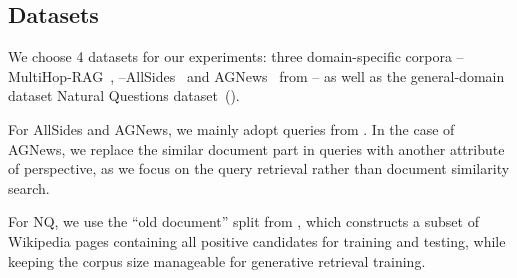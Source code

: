 \subsection{Datasets}
We choose 4 datasets for our experiments: three domain-specific corpora -- MultiHop-RAG~\citep{DBLP:journals/corr/abs-2401-15391}, --AllSides~\citep{baly-etal-2020-detect} and AGNews~\citep{DBLP:conf/nips/YuZZMRKSZ23} from \citet{DBLP:journals/corr/abs-2405-02714} -- as well as the general-domain dataset Natural Questions dataset~(\citealp[NQ]{kwiatkowski-etal-2019-natural}).

For AllSides and AGNews, we mainly adopt queries from \citet{DBLP:journals/corr/abs-2405-02714}.
In the case of AGNews, we replace the similar document part in queries with another attribute of perspective, as we focus on the query retrieval rather than document similarity search.

For NQ, we use the ``old document'' split from \citet{DBLP:conf/icml/KishoreWLAW23}, which constructs a subset of Wikipedia pages containing all positive candidates for training and testing, while keeping the corpus size manageable for generative retrieval training.
